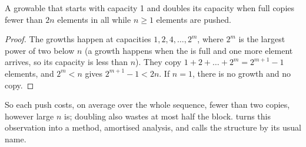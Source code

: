 \label{lst:b1:dynamic-memory:copies}

\label{out:b1:dynamic-memory:copies}

\begin{proposition}\label{prop:b1:dynamic-memory:doubling}
A growable  that starts with capacity 1 and doubles its capacity when full copies fewer than $2n$ elements in all
while $n \geq 1$ elements are pushed.
\end{proposition}

\begin{proof}
The growths happen at capacities $1, 2, 4, \dots, 2^m$, where $2^m$ is the largest power of two below $n$ (a growth
happens when the  is full and one more element arrives, so its capacity is less than $n$). They copy
$1 + 2 + \dots + 2^m = 2^{m+1} - 1$ elements, and $2^m < n$ gives $2^{m+1} - 1 < 2n$. If $n = 1$, there is no growth
and no copy.
\end{proof}

So each push costs, on average over the whole sequence, fewer than two copies, however large $n$ is; doubling also
wastes at most half the block.  turns this observation into a method, amortised analysis,
and calls the structure by its usual name.

\begin{omfigure}
\par{}
\end{omfigure}

